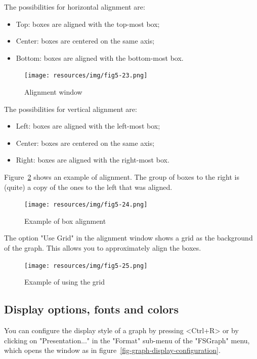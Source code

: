 \bigskip
\noindent The possibilities for horizontal alignment are:
\begin{itemize}
  \item Top: boxes are aligned with  the top-most box;
  \item Center: boxes are centered on the same axis;
  \item Bottom: boxes are aligned with the bottom-most box.
\end{itemize}

\begin{figure}[!ht]
\begin{center}
\texttt{[image: resources/img/fig5-23.png]}
\caption{Alignment window\label{fig-alignment-frame}}
\end{center}
\end{figure}

\noindent The possibilities for vertical alignment are:
\begin{itemize}
  \item Left: boxes are aligned with the left-most box;
  \item Center: boxes are centered on the same axis;
  \item Right: boxes are aligned with the right-most box.
\end{itemize}

\bigskip
\noindent Figure~\ref{fig-vertical-left-alignment} shows an example
of alignment. The group of boxes to the right is (quite) a copy of the ones to the
left that was aligned.

\bigskip
\begin{figure}[!ht]
\begin{center}
\texttt{[image: resources/img/fig5-24.png]}
\caption{Example of box alignment\label{fig-vertical-left-alignment}}
\end{center}
\end{figure}

\bigskip
\noindent The option "Use Grid" in the alignment window shows a grid as the
background of the graph. This allows you to approximately align the
boxes.

\bigskip
\begin{figure}[!ht]
\begin{center}
\texttt{[image: resources/img/fig5-25.png]}
\caption{Example of using the grid}
\end{center}
\end{figure}

\subsection{Display options, fonts and colors}
\label{section-display-fonts-colors}
You can configure the display style of a graph by pressing <Ctrl+R> or by
clicking on "Presentation..." in the "Format" sub-menu of the "FSGraph" menu,
which opens the window as in
figure~\ref{fig-graph-display-configuration}.

